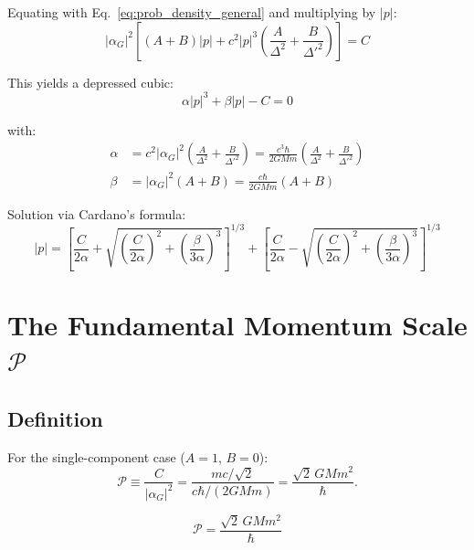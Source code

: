 \documentclass[11pt,a4paper]{article}
\theoremstyle{definition}
\theoremstyle{remark}
\begin{document}
	Equating with Eq.~\eqref{eq:prob_density_general} and multiplying by $|p|$:
	\begin{equation}
		|\alpha_G|^2\!\left[(A+B)|p| + c^2|p|^3\!\left(\frac{A}{\Delta^2}+\frac{B}{\Delta'^2}\right)\right] = C
	\end{equation}
	
	This yields a depressed cubic:
	\begin{equation}
		\boxed{\alpha|p|^3 + \beta|p| - C = 0}
		\label{eq:cubic_momentum}
	\end{equation}
	
	with:
	\begin{align}
		\alpha &= c^2|\alpha_G|^2\!\left(\frac{A}{\Delta^2}+\frac{B}{\Delta'^2}\right) = \frac{c^3\hbar}{2GMm}\!\left(\frac{A}{\Delta^2}+\frac{B}{\Delta'^2}\right) \label{eq:alpha_coeff}\\
		\beta  &= |\alpha_G|^2(A+B) = \frac{c\hbar}{2GMm}(A+B) \label{eq:beta_coeff}
	\end{align}
	
	Solution via Cardano's formula:
	\begin{equation}
		|p| = \left[\frac{C}{2\alpha}+\sqrt{\left(\frac{C}{2\alpha}\right)^2+\left(\frac{\beta}{3\alpha}\right)^3}\right]^{1/3}
		+ \left[\frac{C}{2\alpha}-\sqrt{\left(\frac{C}{2\alpha}\right)^2+\left(\frac{\beta}{3\alpha}\right)^3}\right]^{1/3}
		\label{eq:cardano_solution}
	\end{equation}
	
	\section{The Fundamental Momentum Scale $\mathcal{P}$}
	
	\subsection{Definition}
	
	For the single-component case ($A=1$, $B=0$):
	\begin{equation}
		\mathcal{P} \equiv \frac{C}{|\alpha_G|^2} = \frac{mc/\sqrt{2}}{c\hbar/(2GMm)} = \frac{\sqrt{2}\,GMm^2}{\hbar}.
	\end{equation}
	
	\begin{equation}
		\boxed{\mathcal{P} = \frac{\sqrt{2}\,GMm^2}{\hbar}}
		\label{eq:B_final}
	\end{equation}
	
\end{document}
